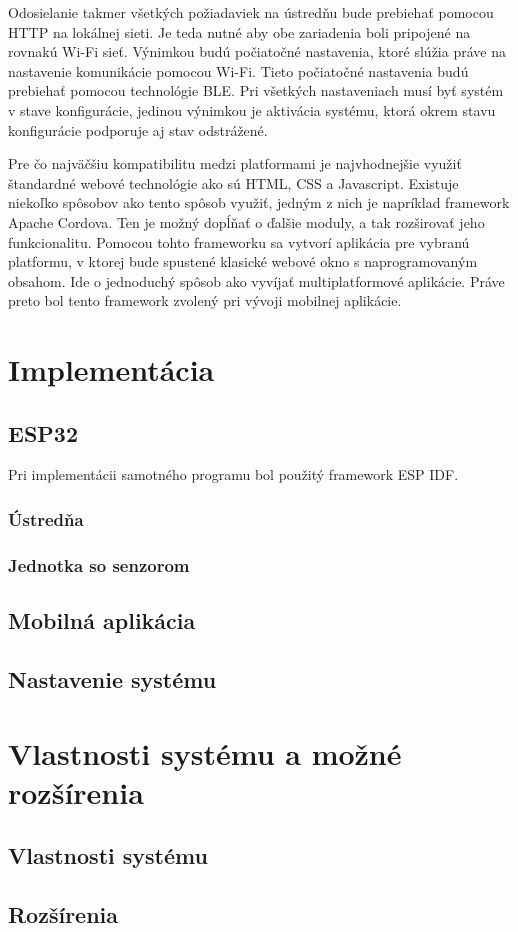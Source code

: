 Odosielanie takmer všetkých požiadaviek na ústredňu bude prebiehať pomocou HTTP na lokálnej sieti. Je teda nutné aby obe zariadenia boli pripojené na rovnakú Wi-Fi sieť. Výnimkou budú počiatočné nastavenia, ktoré slúžia práve na nastavenie komunikácie pomocou Wi-Fi. Tieto počiatočné nastavenia budú prebiehať pomocou technológie BLE. Pri všetkých nastaveniach musí byť systém v stave konfigurácie, jedinou výnimkou je aktivácia systému, ktorá okrem stavu konfigurácie podporuje aj stav odstrážené.

Pre čo najväčšiu kompatibilitu medzi platformami je najvhodnejšie využiť štandardné webové technológie ako sú HTML, CSS a Javascript. Existuje niekoľko spôsobov ako tento spôsob využiť, jedným z nich je napríklad framework Apache Cordova. Ten je možný dopĺňať o ďalšie moduly, a tak rozširovať jeho funkcionalitu. Pomocou tohto frameworku sa vytvorí aplikácia pre vybranú platformu, v ktorej bude spustené klasické webové okno s naprogramovaným obsahom. Ide o jednoduchý spôsob ako vyvíjať multiplatformové aplikácie. Práve preto bol tento framework zvolený pri vývoji mobilnej aplikácie.
    

\chapter{Implementácia}

\section{ESP32}

Pri implementácii samotného programu bol použitý framework ESP IDF.

\subsection{Ústredňa}

\subsection{Jednotka so senzorom}

\section{Mobilná aplikácia}

\section{Nastavenie systému}



\chapter{Vlastnosti systému a možné rozšírenia}

\section{Vlastnosti systému}

\section{Rozšírenia}

